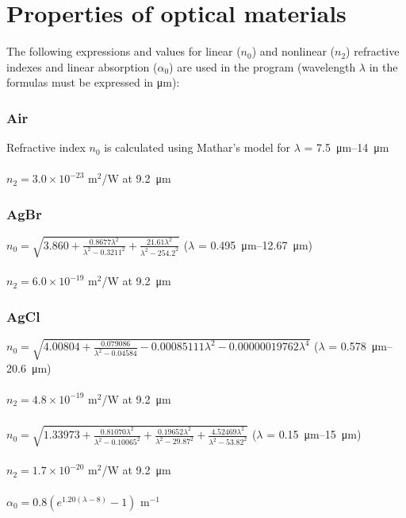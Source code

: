 \chapter{Properties of optical materials}
\label{appendix:optical_constants}
The following expressions and values for linear ($n_0$) and nonlinear ($n_2$) refractive indexes and linear absorption ($\alpha_0$) are used in the program (wavelength $\lambda$ in the formulas must be expressed in \si{\micro\meter}):

\subsection*{Air}
Refractive index $n_0$ is calculated using Mathar's model for \(\lambda\) = \SIrange{7.5}{14}{\micro\meter} \cite{Mathar-2007}\\
\\
$n_2 = 3.0\times 10^{-23}$ m$^2$/W at \SI{9.2}{\micro\meter} \cite{Polyanskiy-2021a}

\subsection*{AgBr}
$n_0=\sqrt{3.860 + \frac{0.8677\lambda^2}{\lambda^2-0.3211^2} + \frac{21.61\lambda^2}{\lambda^2-254.2^2}}$ (\(\lambda\) = \SIrange{0.495}{12.67}{\micro\meter}) \cite{Polyanskiy-2023}\\
\\
$n_2 = 6.0\times 10^{-19}$ m$^2$/W at \SI{9.2}{\micro\meter} \cite{Polyanskiy-2023}

\subsection*{AgCl}
$n_0=\sqrt{4.00804+\frac{0.079086}{\lambda^2-0.04584}-0.00085111\lambda^2-0.00000019762\lambda^4}$ (\(\lambda\) = \SIrange{0.578}{20.6}{\micro\meter}) \cite{Tilton-1950}\\
\\
$n_2 = 4.8\times 10^{-19}$ m$^2$/W at \SI{9.2}{\micro\meter} \cite{Polyanskiy-2023}

\subsection*{}
$n_0=\sqrt{1.33973+\frac{0.81070\lambda^2}{\lambda^2-0.10065^2}+\frac{0.19652\lambda^2}{\lambda^2-29.87^2}+\frac{4.52469\lambda^2}{\lambda^2-53.82^2}}$ (\(\lambda\) = \SIrange{0.15}{15}{\micro\meter}) \cite{Li-1980}\\
\\
$n_2 = 1.7\times 10^{-20}$ m$^2$/W at \SI{9.2}{\micro\meter} \cite{Polyanskiy-2021b}\\
\\
$\alpha_0 = 0.8 (e^{1.20(\lambda-8)}-1)$ m$^{-1}$ \cite{Polyanskiy-2023}

